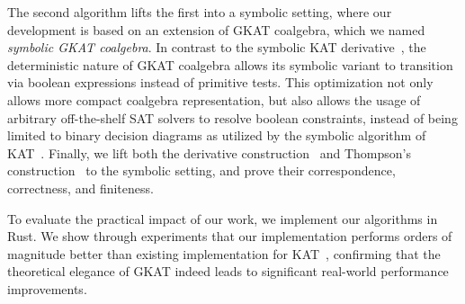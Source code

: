 \documentclass[conference]{IEEEtran}
\begin{document}
The second algorithm lifts the first into a symbolic setting, where our development is based on an extension of GKAT coalgebra, which we named \emph{symbolic GKAT coalgebra}.
In contrast to the symbolic KAT derivative~\cite{pous_SymbolicAlgorithmsLanguage_2015}, the deterministic nature of GKAT coalgebra allows its symbolic variant to transition via boolean expressions instead of primitive tests. 
This optimization not only allows more compact coalgebra representation, but also allows the usage of arbitrary off-the-shelf SAT solvers to resolve boolean constraints, instead of being limited to binary decision diagrams as utilized by the symbolic algorithm of KAT~\cite{pous_SymbolicAlgorithmsLanguage_2015}. 
Finally, we lift both the derivative construction~\cite{schmid_GuardedKleeneAlgebra_2021} and Thompson's construction~\cite{smolka_GuardedKleeneAlgebra_2020} to the symbolic setting, and prove their correspondence, correctness, and finiteness.

To evaluate the practical impact of our work, we implement our algorithms in Rust. We show through experiments that
our implementation performs orders of magnitude better than existing implementation for KAT~\cite{pous_SymbolicAlgorithmsLanguage_2015},
confirming that the theoretical elegance of GKAT indeed leads to significant real-world performance improvements.
\end{document}
